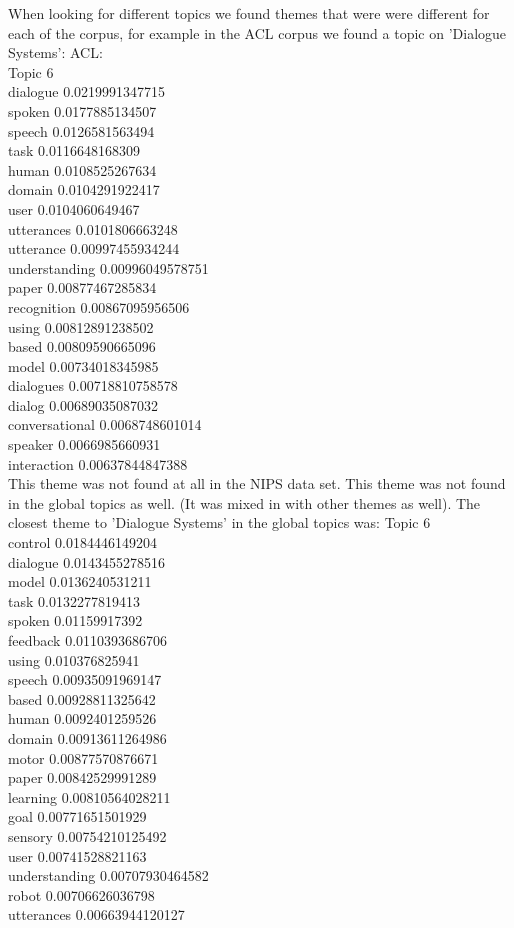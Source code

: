 \documentclass{article}
\begin{document}
When looking for different topics we found themes that were were different for each of the corpus, for example in the ACL corpus we found a topic on 'Dialogue Systems':
ACL:\\
Topic 6\\
dialogue 0.0219991347715\\
spoken 0.0177885134507\\
speech 0.0126581563494\\
task 0.0116648168309\\
human 0.0108525267634\\
domain 0.0104291922417\\
user 0.0104060649467\\
utterances 0.0101806663248\\
utterance 0.00997455934244\\
understanding 0.00996049578751\\
paper 0.00877467285834\\
recognition 0.00867095956506\\
using 0.00812891238502\\
based 0.00809590665096\\
model 0.00734018345985\\
dialogues 0.00718810758578\\
dialog 0.00689035087032\\
conversational 0.0068748601014\\
speaker 0.0066985660931\\
interaction 0.00637844847388\\

This theme was not found at all in the NIPS data set. This theme was not found in the global topics as well.
(It was mixed in with other themes as well). The closest theme to 'Dialogue Systems' in the global topics was:
Topic 6\\
control 0.0184446149204\\
dialogue 0.0143455278516\\
model 0.0136240531211\\
task 0.0132277819413\\
spoken 0.01159917392\\
feedback 0.0110393686706\\
using 0.010376825941\\
speech 0.00935091969147\\
based 0.00928811325642\\
human 0.0092401259526\\
domain 0.00913611264986\\
motor 0.00877570876671\\
paper 0.00842529991289\\
learning 0.00810564028211\\
goal 0.00771651501929\\
sensory 0.00754210125492\\
user 0.00741528821163\\
understanding 0.00707930464582\\
robot 0.00706626036798\\
utterances 0.00663944120127\\
\end{document}
